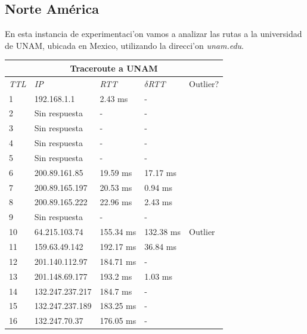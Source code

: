\subsection{Norte América}

En esta instancia de experimentaci'on vamos a analizar las rutas a la universidad de UNAM, ubicada en Mexico, utilizando la direcci'on \textit{unam.edu}. 

\begin{tabular}{ |p{1cm}||p{3cm}|p{2cm}|p{2cm}|p{1.5cm}|  }
 \hline
 \multicolumn{5}{|c|}{Traceroute a UNAM} \\
 \hline
 \textit{TTL} & \textit{IP}  & \textit{RTT} & $\delta$\textit{RTT} & Outlier? \\
 \hline
1    &    192.168.1.1    &     2.43 ms      &     -           &     \\               
2    &    Sin respuesta              &    -             &    -           &          \\                  
3     &   Sin respuesta              &    -            &     -         &        \\               
4    &    Sin respuesta               &    -            &     -          &        \\                   
5    &    Sin respuesta                &   -            &     -          &        \\                
6     &   200.89.161.85   &    19.59 ms     &     17.17 ms   &        \\              
7     &   200.89.165.197  &    20.53 ms     &     0.94 ms   &        \\            
8    &    200.89.165.222  &    22.96 ms     &     2.43 ms   &      \\               
9    &    Sin respuesta               &    -            &     -         &         \\                 
10   &    64.215.103.74    &   155.34 ms     &    132.38 ms  &  Outlier  \\    
11   &    159.63.49.142    &   192.17 ms    &     36.84 ms    &           \\              
12   &    201.140.112.97   &   184.71 ms    &     -         &           \\                
13   &    201.148.69.177   &   193.2 ms     &     1.03 ms         &      \\                    
14   &    132.247.237.217  &   184.7 ms      &    -         &           \\                 
15   &    132.247.237.189  &   183.25 ms    &     -         &          \\                  
16    &   132.247.70.37    &   176.05 ms     &    -        &       \\   
 \hline
\end{tabular}

